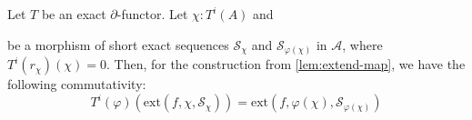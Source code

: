 \begin{lemma}
  \label{lem:extension-welldefined}
  Let $T$ be an exact $\partial$-functor.
  Let $\chi:T^i(A)$ and
  \begin{center}
  \end{center}
  be a morphism of short exact sequences ${\mathcal S}_\chi$ and $\mathcal{S}_{\varphi(\chi)}$ in $\mathcal A$,
  where $T^i(r_\chi)(\chi)=0$.
  Then, for the construction from \cref{lem:extend-map}, we have the following commutativity:
  \[ T^i(\varphi)(\mathrm{ext}(f,\chi,{\mathcal S}_\chi)) = \mathrm{ext}(f,\varphi(\chi),\mathcal{S}_{\varphi(\chi)}) \]
\end{lemma}

